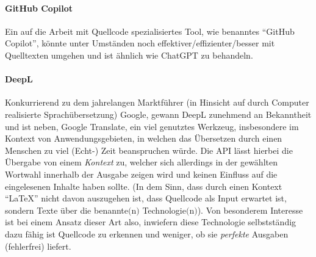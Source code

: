 \paragraph*{GitHub Copilot}\par
Ein auf die Arbeit mit Quellcode spezialisiertes Tool, wie benanntes \enquote{GitHub Copilot}, könnte unter Umständen noch effektiver/effizienter/besser mit Quelltexten umgehen und ist ähnlich wie ChatGPT zu behandeln.

\paragraph*{DeepL}\par
Konkurrierend zu dem jahrelangen Marktführer (in Hinsicht auf durch Computer realisierte Sprachübersetzung) Google, gewann DeepL zunehmend an Bekanntheit und ist neben, Google Translate, ein viel genutztes Werkzeug, insbesondere im Kontext von Anwendungsgebieten, in welchen das Übersetzen durch einen Menschen zu viel (Echt-) Zeit beanspruchen würde. Die API lässt hierbei die Übergabe von einem \textit{Kontext} zu, welcher sich allerdings in der gewählten Wortwahl innerhalb der Ausgabe zeigen wird und keinen Einfluss auf die eingelesenen Inhalte haben sollte. (In dem Sinn, dass durch einen Kontext \enquote{LaTeX} nicht davon auszugehen ist, dass Quellcode als Input erwartet ist, sondern Texte über die benannte$($n$)$ Technologie$($n$)$). Von besonderem Interesse ist bei einem Ansatz dieser Art also, inwiefern diese Technologie selbstständig dazu fähig ist Quellcode zu erkennen und weniger, ob sie \textit{perfekte} Ausgaben (fehlerfrei) liefert.

